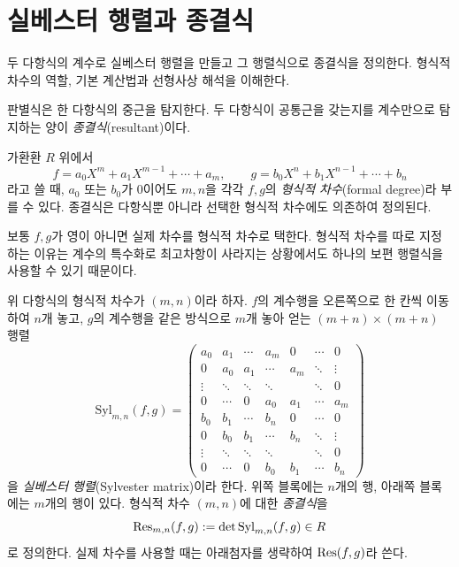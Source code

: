 \clearpage
\section{실베스터 행렬과 종결식}
\label{sec:sylvester-resultant}

\begin{learninggoal}
두 다항식의 계수로 실베스터 행렬을 만들고 그 행렬식으로 종결식을 정의한다. 형식적 차수의 역할, 기본 계산법과 선형사상 해석을 이해한다.
\end{learninggoal}

판별식은 한 다항식의 중근을 탐지한다. 두 다항식이 공통근을 갖는지를 계수만으로 탐지하는 양이 \emph{종결식}(resultant)이다.

\begin{definition}[형식적 차수]
가환환 $R$ 위에서
\[
  f=a_0X^m+a_1X^{m-1}+\cdots+a_m,
  \qquad
  g=b_0X^n+b_1X^{n-1}+\cdots+b_n
\]
라고 쓸 때, $a_0$ 또는 $b_0$가 $0$이어도 $m,n$을 각각 $f,g$의 \emph{형식적 차수}(formal degree)라 부를 수 있다. 종결식은 다항식뿐 아니라 선택한 형식적 차수에도 의존하여 정의된다.
\end{definition}

보통 $f,g$가 영이 아니면 실제 차수를 형식적 차수로 택한다. 형식적 차수를 따로 지정하는 이유는 계수의 특수화로 최고차항이 사라지는 상황에서도 하나의 보편 행렬식을 사용할 수 있기 때문이다.

\begin{definition}
위 다항식의 형식적 차수가 $(m,n)$이라 하자. $f$의 계수행을 오른쪽으로 한 칸씩 이동하여 $n$개 놓고, $g$의 계수행을 같은 방식으로 $m$개 놓아 얻는 $(m+n)\times(m+n)$ 행렬
\[
  \mathrm{Syl}_{m,n}(f,g)=
  \begin{pmatrix}
  a_0&a_1&\cdots&a_m&0&\cdots&0\\
  0&a_0&a_1&\cdots&a_m&\ddots&\vdots\\
  \vdots&\ddots&\ddots&\ddots&&\ddots&0\\
  0&\cdots&0&a_0&a_1&\cdots&a_m\\[2pt]
  b_0&b_1&\cdots&b_n&0&\cdots&0\\
  0&b_0&b_1&\cdots&b_n&\ddots&\vdots\\
  \vdots&\ddots&\ddots&\ddots&&\ddots&0\\
  0&\cdots&0&b_0&b_1&\cdots&b_n
  \end{pmatrix}
\]
을 \emph{실베스터 행렬}(Sylvester matrix)이라 한다. 위쪽 블록에는 $n$개의 행, 아래쪽 블록에는 $m$개의 행이 있다. 형식적 차수 $(m,n)$에 대한 \emph{종결식}을
\[
  \operatorname{Res}_{m,n}(f,g)
  :=\det\mathrm{Syl}_{m,n}(f,g)
  \in R
\]
로 정의한다. 실제 차수를 사용할 때는 아래첨자를 생략하여 $\operatorname{Res}(f,g)$라 쓴다.
\end{definition}

